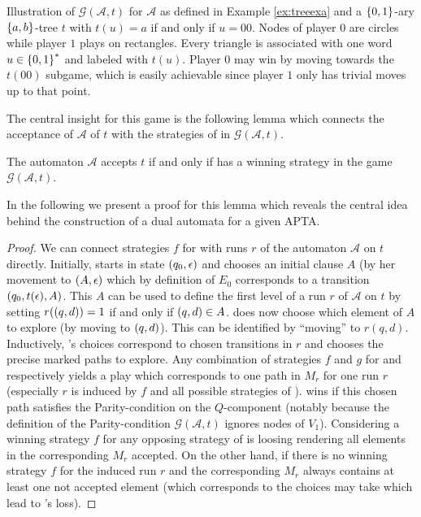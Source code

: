 \begin{drawing}
  \caption{
    Illustration of $\mathcal{G}(\mathcal{A}, t)$ for $\mathcal{A}$ as
    defined in Example \ref{ex:treeexa} and a $\left\{0,1\right\}$-ary $\left\{a,b\right\}$-tree
    $t$ with $t(u) = a$ if and only if $u = 00$. Nodes of player $0$ are 
    circles while player $1$ plays on rectangles. Every triangle is 
    associated with one word $u\in\left\{0,1\right\}^{*}$ and labeled with $t(u)$. 
    Player $0$ may win by moving towards the $t(00)$ subgame, which is easily
    achievable since player $1$ only has trivial moves up to that point.
  }
  \label{fig:treeacceptancegame}
  \begin{center}
  \end{center}
\end{drawing}

The central insight for this game is the following lemma which connects the 
acceptance of $\mathcal{A}$ of $t$ with the strategies of \eve{} in 
$\mathcal{G}(\mathcal{A}, t)$.
\begin{lemma}
  \cite[Lemma 3.1.]{AltTreeAuto}
  The automaton $\mathcal{A}$ accepts $t$ if and only if \eve{} has a 
  winning strategy in the game $\mathcal{G}(\mathcal{A}, t)$.
  \label{lem:stratacceptance}
\end{lemma}
In the following we present a proof for this lemma which reveals the 
central idea behind the construction of a dual automata for a given \ac{APTA}.
\begin{proof}
  We can connect strategies $f$ for \eve{} with runs $r$ of the automaton 
  $\mathcal{A}$ on $t$ directly. Initially, \eve{} starts in state 
  $\left(q_{0}, \epsilon\right)$ and chooses an initial clause $A$ (by her movement
  to $\left(A, \epsilon\right)$ which by definition of $E_{0}$ corresponds to a 
  transition $\left(q_{0}, t(\epsilon), A\right)$. This $A$ can be used to define 
  the first level of a run $r$ of $\mathcal{A}$ on $t$ by setting 
  $r(\left(q,d\right)) = 1$ if and only if $\left(q,d\right)\in A$. \adam{} does now 
  choose which element of $A$ to explore (by moving to $\left(q, d\right)$). This 
  can be identified by \enquote{moving} to $r(q, d)$. Inductively, \eve{}'s 
  choices correspond to chosen transitions in $r$ and \adam{} chooses the 
  precise marked paths to explore. Any combination of strategies $f$ and $g$
  for \eve{} and \adam{} respectively yields a play which corresponds to one 
  path in $M_{r}$ for one run $r$ (especially $r$ is induced by $f$ and all
  possible strategies of \adam{}). \eve{} wins if this chosen path satisfies
  the Parity-condition on the $Q$-component (notably because the definition of
  the Parity-condition $\mathcal{G}(\mathcal{A}, t)$ ignores nodes of $V_{1}$).
  Considering a winning strategy $f$ for \eve{} any opposing strategy of 
  \adam{} is loosing rendering all elements in the corresponding $M_{r}$ 
  accepted. On the other hand, if there is no winning strategy $f$ for \eve{}
  the induced run $r$ and the corresponding $M_{r}$ always contains at least 
  one not accepted element (which corresponds to the choices \adam{} may take 
  which lead to \eve{}'s loss).
\end{proof}

